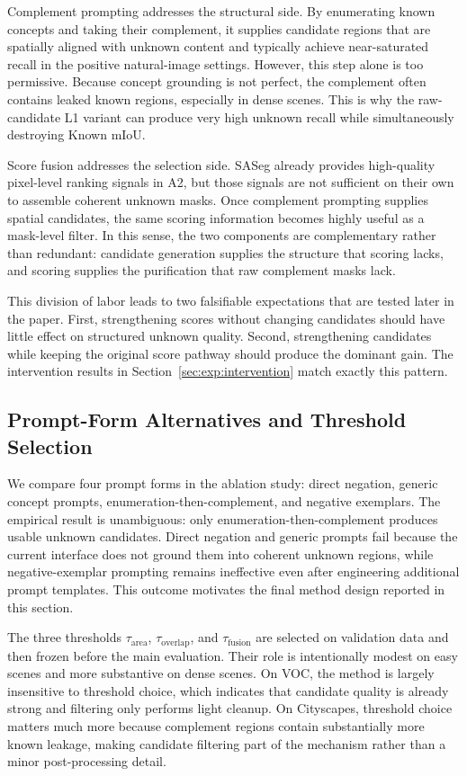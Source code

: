 \documentclass[a4paper,fleqn]{cas-dc}
\begin{document}
Complement prompting addresses the structural side. By enumerating known concepts and taking their complement, it supplies candidate regions that are spatially aligned with unknown content and typically achieve near-saturated recall in the positive natural-image settings. However, this step alone is too permissive. Because concept grounding is not perfect, the complement often contains leaked known regions, especially in dense scenes. This is why the raw-candidate L1 variant can produce very high unknown recall while simultaneously destroying Known mIoU.

Score fusion addresses the selection side. SASeg already provides high-quality pixel-level ranking signals in A2, but those signals are not sufficient on their own to assemble coherent unknown masks. Once complement prompting supplies spatial candidates, the same scoring information becomes highly useful as a mask-level filter. In this sense, the two components are complementary rather than redundant: candidate generation supplies the structure that scoring lacks, and scoring supplies the purification that raw complement masks lack.

This division of labor leads to two falsifiable expectations that are tested later in the paper. First, strengthening scores without changing candidates should have little effect on structured unknown quality. Second, strengthening candidates while keeping the original score pathway should produce the dominant gain. The intervention results in Section~\ref{sec:exp:intervention} match exactly this pattern.

\subsection{Prompt-Form Alternatives and Threshold Selection}
\label{sec:method:threshold}

We compare four prompt forms in the ablation study: direct negation, generic concept prompts, enumeration-then-complement, and negative exemplars. The empirical result is unambiguous: only enumeration-then-complement produces usable unknown candidates. Direct negation and generic prompts fail because the current interface does not ground them into coherent unknown regions, while negative-exemplar prompting remains ineffective even after engineering additional prompt templates. This outcome motivates the final method design reported in this section.

The three thresholds $\tau_{\text{area}}$, $\tau_{\text{overlap}}$, and $\tau_{\text{fusion}}$ are selected on validation data and then frozen before the main evaluation. Their role is intentionally modest on easy scenes and more substantive on dense scenes. On VOC, the method is largely insensitive to threshold choice, which indicates that candidate quality is already strong and filtering only performs light cleanup. On Cityscapes, threshold choice matters much more because complement regions contain substantially more known leakage, making candidate filtering part of the mechanism rather than a minor post-processing detail.
\end{document}
